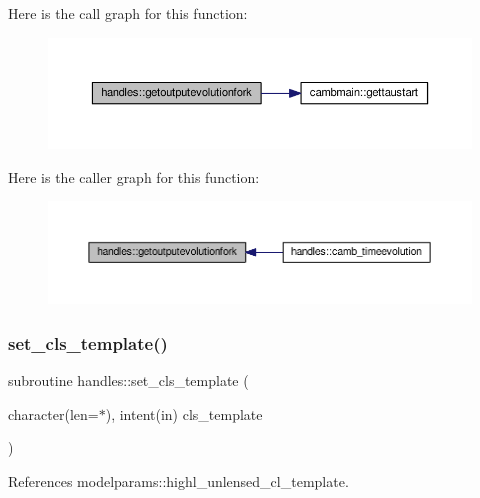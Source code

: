 Here is the call graph for this function\+:
\nopagebreak
\begin{figure}[H]
\begin{center}
\leavevmode
\includegraphics[width=350pt]{namespacehandles_abde0c82099eadde40e5f09d895ec6ebb_cgraph}
\end{center}
\end{figure}
Here is the caller graph for this function\+:
\nopagebreak
\begin{figure}[H]
\begin{center}
\leavevmode
\includegraphics[width=350pt]{namespacehandles_abde0c82099eadde40e5f09d895ec6ebb_icgraph}
\end{center}
\end{figure}
\mbox{\label{namespacehandles_a9622707d668c5bb52a241302010db94f}} 
\subsubsection{\texorpdfstring{set\+\_\+cls\+\_\+template()}{set\_cls\_template()}}
{\footnotesize\ttfamily subroutine handles\+::set\+\_\+cls\+\_\+template (\begin{DoxyParamCaption}\item[{character(len=$\ast$), intent(in)}]{cls\+\_\+template }\end{DoxyParamCaption})}



References modelparams\+::highl\+\_\+unlensed\+\_\+cl\+\_\+template.

